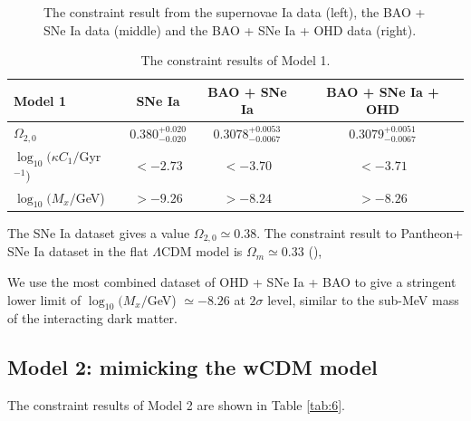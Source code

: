 \documentclass[twocolumn]{aastex631}
\begin{document}
\begin{figure}
{      }
      \caption{The constraint result from the supernovae Ia data
      (left), the BAO + SNe Ia data (middle) and the BAO + SNe Ia + OHD data (right).}
      \label{fig:1}
   \end{figure}

   \begin{table}
      \centering
      \begin{tabular}{lccc}
         \hline\hline
         Model 1 & SNe Ia & BAO + SNe Ia & BAO + SNe Ia + OHD \\
         \hline
         $\Omega_{2,0}$ & $0.380_{-0.020}^{+0.020}$
          & $0.3078_{-0.0067}^{+0.0053}$ & $0.3079_{-0.0067}^{+0.0051}$ \\
         $\log_{10}(\kappa C_1/$Gyr${}^{-1})$ & $<-2.73$ 
         & $<-3.70$  & $<-3.71$ \\
         $\log_{10}(M_x/$GeV) & $>-9.26$
         & $>-8.24$ & $>-8.26$ \\
         \hline
      \end{tabular}
      \caption{The constraint results of Model 1.}
      \label{tab:5}
   \end{table}

   The SNe Ia dataset gives a value $\Omega_{2,0} \simeq 0.38$. The constraint result to Pantheon+
   SNe Ia dataset in the flat $\Lambda$CDM model is $\Omega_{m} \simeq 0.33$ (\cite{Borghi_2022}),
   
   We use the most combined dataset of OHD + SNe Ia + BAO to give a stringent lower limit
   of $\log_{10}(M_x/$GeV) $\simeq -8.26$ at $2\sigma$ level, similar to the 
   sub-MeV mass of the interacting dark matter.

\subsection{Model 2: mimicking the wCDM model}

   The constraint results of Model 2 are shown in Table \ref{tab:6}.
\end{document}
